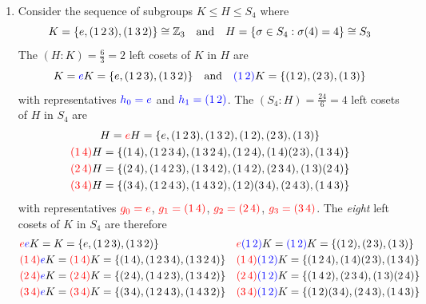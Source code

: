 \begin{examples}{}{}
\begin{enumerate}
	\item Consider the sequence of subgroups $K\le H\le S_4$ where
	\[K=\{e,(1\,2\,3),(1\,3\,2)\}\cong\mathbb{Z}_3\quad\text{and}\quad H=\{\sigma\in S_4:\sigma(4)=4\}\cong S_3\]
	The $(H:K)=\frac 63=2$ left cosets of $K$ in $H$ are
	\[K=\textcolor{blue}{e}K=\{e,(1\,2\,3),(1\,3\,2)\}\quad\text{and}\quad \textcolor{blue}{(1\,2)}K=\{(1\,2),(2\,3),(1\,3)\}\]
	with representatives $\textcolor{blue}{h_0=e}$ and $\textcolor{blue}{h_1=(1\,2)}$. The $(S_4:H)=\frac{24}6=4$ left cosets of $H$ in $S_4$ are
	\begin{gather*}
	H=\textcolor{red}{e}H=\{e,(1\,2\,3),(1\,3\,2),(1\,2),(2\,3),(1\,3)\}\\
	\textcolor{red}{(1\,4)}H=\{(1\,4),(1\,2\,3\,4),(1\,3\,2\,4),(1\,2\,4),(1\,4)(2\,3),(1\,3\,4)\}\\
	\textcolor{red}{(2\,4)}H=\{(2\,4),(1\,4\,2\,3),(1\,3\,4\,2),(1\,4\,2),(2\,3\,4),(1\,3)(2\,4)\}\\
	\textcolor{red}{(3\,4)}H=\{(3\,4),(1\,2\,4\,3),(1\,4\,3\,2),(1\,2)(3\,4),(2\,4\,3),(1\,4\,3)\}
	\end{gather*}
	with representatives $\textcolor{red}{g_0=e}$, $\textcolor{red}{g_1=(1\,4)}$, $\textcolor{red}{g_2=(2\,4)}$, $\textcolor{red}{g_3=(3\,4)}$. The \emph{eight} left cosets of $K$ in $S_4$ are therefore
	\begin{align*}
	&\textcolor{red}{e}\textcolor{blue}{e}K=K=\{e,(1\,2\,3),(1\,3\,2)\}&&\textcolor{red}{e}\textcolor{blue}{(1\,2)}K=\textcolor{blue}{(1\,2)}K=\{(1\,2),(2\,3),(1\,3)\}\\
	&\textcolor{red}{(1\,4)}\textcolor{blue}{e}K=\textcolor{red}{(1\,4)}K=\{(1\,4),(1\,2\,3\,4),(1\,3\,2\,4)\}&&\textcolor{red}{(1\,4)}\textcolor{blue}{(1\,2)}K=\{(1\,2\,4),(1\,4)(2\,3),(1\,3\,4)\}\\
	&\textcolor{red}{(2\,4)}\textcolor{blue}{e}K=\textcolor{red}{(2\,4)}K=\{(2\,4),(1\,4\,2\,3),(1\,3\,4\,2)\}&&\textcolor{red}{(2\,4)}\textcolor{blue}{(1\,2)}K=\{(1\,4\,2),(2\,3\,4),(1\,3)(2\,4)\}\\
	&\textcolor{red}{(3\,4)}\textcolor{blue}{e}K=\textcolor{red}{(3\,4)}K=\{(3\,4),(1\,2\,4\,3),(1\,4\,3\,2)\}&&\textcolor{red}{(3\,4)}\textcolor{blue}{(1\,2)}K=\{(1\,2)(3\,4),(2\,4\,3),(1\,4\,3)\}
	\end{align*}

\end{enumerate}
\end{examples}







